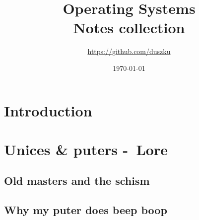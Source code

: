 \documentclass[a4paper,oneside]{book}
\title{Operating Systems\\\large{Notes collection}}
\author{\href{https://github.com/duszku}{https://github.com/duszku}}
\date{\today}
\begin{document}
    \maketitle
    \tableofcontents

    \chapter{Introduction}
    


    \chapter{Unices \& puters -~Lore}
    \section{Old masters and the schism}
    
    \section{Why my puter does beep boop}
    
\end{document}
